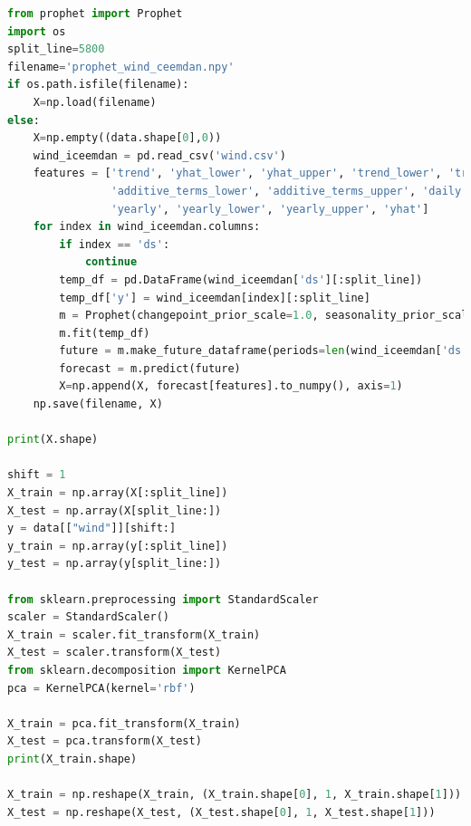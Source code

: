 \documentclass[AutoFakeBold]{LZUThesis}
\begin{document}
\begin{lstlisting}[language = python]
from prophet import Prophet
import os
split_line=5800
filename='prophet_wind_ceemdan.npy'
if os.path.isfile(filename):
    X=np.load(filename)
else:
    X=np.empty((data.shape[0],0))
    wind_iceemdan = pd.read_csv('wind.csv')
    features = ['trend', 'yhat_lower', 'yhat_upper', 'trend_lower', 'trend_upper', 'additive_terms',
                'additive_terms_lower', 'additive_terms_upper', 'daily', 'daily_lower', 'daily_upper',
                'yearly', 'yearly_lower', 'yearly_upper', 'yhat']
    for index in wind_iceemdan.columns:
        if index == 'ds':
            continue
        temp_df = pd.DataFrame(wind_iceemdan['ds'][:split_line])
        temp_df['y'] = wind_iceemdan[index][:split_line]
        m = Prophet(changepoint_prior_scale=1.0, seasonality_prior_scale=0.1, seasonality_mode='additive', changepoint_range=1, yearly_seasonality=True)
        m.fit(temp_df)
        future = m.make_future_dataframe(periods=len(wind_iceemdan['ds'])-split_line, freq='3H')
        forecast = m.predict(future)
        X=np.append(X, forecast[features].to_numpy(), axis=1)
    np.save(filename, X)

print(X.shape)

shift = 1
X_train = np.array(X[:split_line])
X_test = np.array(X[split_line:])
y = data[["wind"]][shift:]
y_train = np.array(y[:split_line])
y_test = np.array(y[split_line:])

from sklearn.preprocessing import StandardScaler
scaler = StandardScaler()
X_train = scaler.fit_transform(X_train)
X_test = scaler.transform(X_test)
from sklearn.decomposition import KernelPCA
pca = KernelPCA(kernel='rbf')

X_train = pca.fit_transform(X_train)
X_test = pca.transform(X_test)
print(X_train.shape)

X_train = np.reshape(X_train, (X_train.shape[0], 1, X_train.shape[1]))
X_test = np.reshape(X_test, (X_test.shape[0], 1, X_test.shape[1]))


\end{lstlisting}
\end{document}
